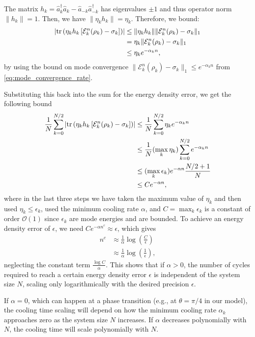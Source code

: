 The matrix $h_k = \hat{a}^\dagger_k \hat{a}_k-\hat{a}_{-k}\hat{a}_{-k}^\dagger$ has eigenvalues $\pm 1$ and thus operator norm $\|h_k\| = 1$.
Then, we have $\|\eta_k h_k\| = \eta_k$. Therefore, we bound:
\begin{align}
    \left|\operatorname{tr}\left(\eta_k h_k \left[\mathcal{E}_k^n(\rho_k)- \sigma_k\right]\right)\right|
     &\le \|\eta_k h_k\| \|\mathcal{E}_k^n(\rho_k)- \sigma_k\|_1 \nonumber\\
     &= \eta_k \|\mathcal{E}_k^n(\rho_k)- \sigma_k\|_1 \nonumber\\
     &\le \eta_k e^{-\alpha_k n},
\end{align}
by using the bound on mode convergence $\|\mathcal{E}_k^n(\rho_k)-\sigma_k\|_1 \le e^{-\alpha_k n}$ from \cref{eq:mode_convergence_rate}.

Substituting this back into the sum for the energy density error, we get the following bound
\begin{align}
    \frac{1}{N}\sum_{k=0}^{N/2} \left|\operatorname{tr}\left(\eta_k h_k \left[\mathcal{E}_k^n(\rho_k)- \sigma_k\right]\right)\right|
     &\le \frac{1}{N}\sum_{k=0}^{N/2} \eta_k e^{-\alpha_k n} \nonumber\\
     &\le \frac{1}{N}(\max_k \eta_k) \sum_{k=0}^{N/2} e^{-\alpha_k n} \nonumber\\
     &\le (\max_k \epsilon_k) e^{-\alpha n} \frac{N/2 + 1}{N} \nonumber\\
     &\le C e^{-\alpha n},
\end{align}
where in the last three steps we have taken the maximum value of $\eta_k$ and then used $\eta_k\le\epsilon_k$, used the minimum cooling rate $\alpha$, and $C = \max_k \epsilon_k$ is a constant of order $\mathcal{O}(1)$ since $\epsilon_k$ are mode energies and are bounded.
To achieve an energy density error of $\epsilon$, we need $C e^{-\alpha n^c} \approx \epsilon$, which gives
\begin{align}
    n^c &\approx \frac{1}{\alpha} \log\left(\frac{C}{\epsilon}\right)\nonumber\\
        &\approx \frac{1}{\alpha} \log\left(\frac{1}{\epsilon}\right),
\end{align}
neglecting the constant term $\frac{\log C}{\alpha}$. This shows that if $\alpha > 0$, the number of cycles required to reach a certain energy density error $\epsilon$ is independent of the system size $N$, scaling only logarithmically with the desired precision $\epsilon$.

If $\alpha = 0$, which can happen at a phase transition (e.g., at $\theta = \pi/4$ in our model), the cooling time scaling will depend on how the minimum cooling rate $\alpha_k$ approaches zero as the system size $N$ increases. If $\alpha$ decreases polynomially with $N$, the cooling time will scale polynomially with $N$.


